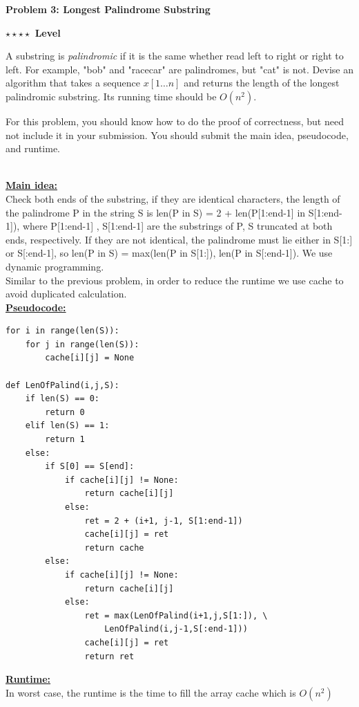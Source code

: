 \documentclass{article}\usepackage[utf8]{inputenc}\usepackage[margin=0.4cm,top=0.4cm,bottom=0.4cm]{geometry}
\begin{document}
\clearpage

\vspace{-2mm}\noindent\begin{mybox}{\begin{center}\textbf{\color{black}Problem 3: Longest Palindrome Substring}\end{center}}\end{mybox}\vspace{-2mm}
\begin{myboxot}\noindent\textbf{$\star\star\star\star$ Level}\end{myboxot} 

\noindent A substring is {\it palindromic} if it is the same whether read left to right or right to left. For example, "bob" and "racecar" are palindromes, but "cat" is not. Devise
an algorithm that takes a sequence $x[1\ldots n]$ and returns the length of the longest palindromic substring. Its running time should be $O(n^2)$.

\vspace{2pt}
\noindent For this problem, you should know how to do the proof of correctness, but need not include it in your
submission. You should submit the main idea, pseudocode, and runtime.

\BeginSolution %
\\
\underline{\textbf{Main idea:}}\\
Check both ends of the substring, if they are identical characters, the length of the palindrome P in the string S is len(P in S) = 2 + len(P[1:end-1] in S[1:end-1]), where P[1:end-1] , S[1:end-1] are the substrings of P, S truncated at both ends, respectively. If they are not identical, the palindrome must lie either in S[1:] or S[:end-1], so len(P in S) = max(len(P in  S[1:]), len(P in S[:end-1]). We use dynamic programming.\\
Similar to the previous problem, in order to reduce the runtime we use cache to avoid duplicated calculation.\\
\underline{\textbf{Pseudocode:}}
%
\begin{lstlisting}
for i in range(len(S)):
	for j in range(len(S)):
		cache[i][j] = None

def LenOfPalind(i,j,S):
	if len(S) == 0:
		return 0
	elif len(S) == 1:
		return 1
	else:
		if S[0] == S[end]:
			if cache[i][j] != None:
				return cache[i][j]
			else:
				ret = 2 + (i+1, j-1, S[1:end-1])
				cache[i][j] = ret
				return cache
		else:
			if cache[i][j] != None:
				return cache[i][j]
			else:
				ret = max(LenOfPalind(i+1,j,S[1:]), \
					LenOfPalind(i,j-1,S[:end-1]))
				cache[i][j] = ret
				return ret
\end{lstlisting}
%
\underline{\textbf{Runtime:}}\\
In worst case, the runtime is the time to fill the array cache which is $O(n^2)$
\EndSolution
\clearpage
\end{document}

